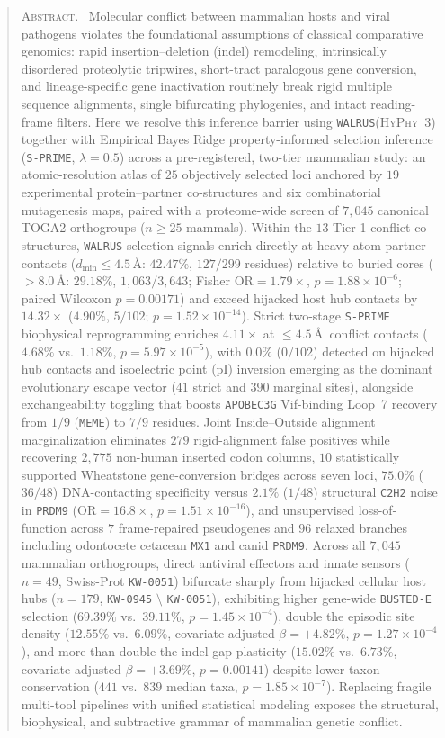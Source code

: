 \documentclass[11pt,letterpaper]{article}
\newcommand{\HyPhyThree}{\textsc{HyPhy~3}\xspace}
\newcommand{\WALRUS}{\texttt{WALRUS}\xspace}
\newcommand{\MEME}{\texttt{MEME}\xspace}
\newcommand{\BUSTEDE}{\texttt{BUSTED-E}\xspace}
\newcommand{\SPRIME}{\texttt{S-PRIME}\xspace}
\renewenvironment{abstract}{\begin{quote}\small\noindent\textsc{Abstract.}\ }{\end{quote}}
\begin{document}
\smallskip
\headerrule
\begin{abstract}
Molecular conflict between mammalian hosts and viral pathogens violates the foundational assumptions of classical comparative genomics: rapid insertion--deletion (indel) remodeling, intrinsically disordered proteolytic tripwires, short-tract paralogous gene conversion, and lineage-specific gene inactivation routinely break rigid multiple sequence alignments, single bifurcating phylogenies, and intact reading-frame filters. Here we resolve this inference barrier using \WALRUS (\HyPhyThree) together with Empirical Bayes Ridge property-informed selection inference (\SPRIME, $\lambda = 0.5$) across a pre-registered, two-tier mammalian study: an atomic-resolution atlas of $25$ objectively selected loci anchored by $19$ experimental protein--partner co-structures and six combinatorial mutagenesis maps, paired with a proteome-wide screen of $7,045$ canonical TOGA2 orthogroups ($n \ge 25$ mammals). Within the $13$ Tier-1 conflict co-structures, \WALRUS selection signals enrich directly at heavy-atom partner contacts ($d_{\min} \le 4.5$\,\AA: $42.47\%$, $127/299$ residues) relative to buried cores ($>8.0$\,\AA: $29.18\%$, $1,063/3,643$; Fisher $\mathrm{OR} = 1.79\times$, $p = 1.88 \times 10^{-6}$; paired Wilcoxon $p = 0.00171$) and exceed hijacked host hub contacts by $14.32\times$ ($4.90\%$, $5/102$; $p = 1.52 \times 10^{-14}$). Strict two-stage \SPRIME biophysical reprogramming enriches $4.11\times$ at $\le 4.5$\,\AA\ conflict contacts ($4.68\%$ vs.\ $1.18\%$, $p = 5.97 \times 10^{-5}$), with $0.0\%$ ($0/102$) detected on hijacked hub contacts and isoelectric point ($\text{pI}$) inversion emerging as the dominant evolutionary escape vector ($41$ strict and $390$ marginal sites), alongside exchangeability toggling that boosts \texttt{APOBEC3G} Vif-binding Loop~7 recovery from $1/9$ (\MEME) to $7/9$ residues. Joint Inside--Outside alignment marginalization eliminates $279$ rigid-alignment false positives while recovering $2,775$ non-human inserted codon columns, $10$ statistically supported Wheatstone gene-conversion bridges across seven loci, $75.0\%$ ($36/48$) DNA-contacting specificity versus $2.1\%$ ($1/48$) structural \texttt{C2H2} noise in \texttt{PRDM9} ($\mathrm{OR} = 16.8\times$, $p = 1.51 \times 10^{-16}$), and unsupervised loss-of-function across $7$ frame-repaired pseudogenes and $96$ relaxed branches including odontocete cetacean \texttt{MX1} and canid \texttt{PRDM9}. Across all $7,045$ mammalian orthogroups, direct antiviral effectors and innate sensors ($n = 49$, Swiss-Prot \texttt{KW-0051}) bifurcate sharply from hijacked cellular host hubs ($n = 179$, \texttt{KW-0945} $\setminus$ \texttt{KW-0051}), exhibiting higher gene-wide \BUSTEDE selection ($69.39\%$ vs.\ $39.11\%$, $p = 1.45 \times 10^{-4}$), double the episodic site density ($12.55\%$ vs.\ $6.09\%$, covariate-adjusted $\beta = +4.82\%$, $p = 1.27 \times 10^{-4}$), and more than double the indel gap plasticity ($15.02\%$ vs.\ $6.73\%$, covariate-adjusted $\beta = +3.69\%$, $p = 0.00141$) despite lower taxon conservation ($441$ vs.\ $839$ median taxa, $p = 1.85 \times 10^{-7}$). Replacing fragile multi-tool pipelines with unified statistical modeling exposes the structural, biophysical, and subtractive grammar of mammalian genetic conflict.

\end{abstract}
\end{document}
